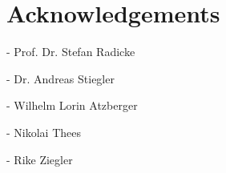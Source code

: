 \chapter{Acknowledgements}

- Prof. Dr. Stefan Radicke

- Dr. Andreas Stiegler

- Wilhelm Lorin Atzberger

- Nikolai Thees

- Rike Ziegler
